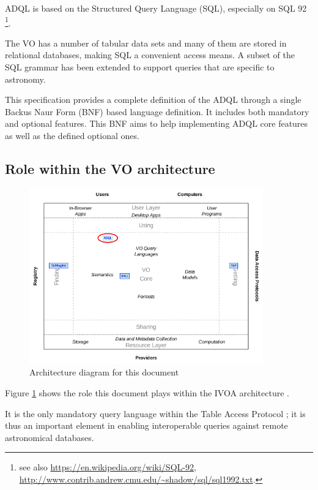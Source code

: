 \documentclass[11pt,a4paper]{ivoa}
\begin{document}
ADQL is based on the Structured Query Language (SQL), especially on SQL
92 \citep{std:SQL1992}\footnote{see also
\url{https://en.wikipedia.org/wiki/SQL-92},
\url{http://www.contrib.andrew.cmu.edu/~shadow/sql/sql1992.txt}.}.

The VO has a number of tabular data sets and many of them are stored in
relational databases, making SQL a convenient access means. A subset of the SQL
grammar has been extended to support queries that are specific to astronomy.

This specification provides a complete definition of the ADQL through a single
Backus Naur Form (BNF) based language definition. It includes both mandatory
and optional features.  This BNF aims to help implementing ADQL core
features as well as the defined optional ones.

\clearpage %
\subsection{Role within the VO architecture}
\label{sec:role}

\begin{figure}[th]
\centering
\includegraphics[width=0.9\textwidth]{role_diagram.pdf}
\caption{Architecture diagram for this document}
\label{fig:archdiag}
\end{figure}

Figure \ref{fig:archdiag} shows the role this document plays within the
IVOA architecture \VOArch{}.

It is the only mandatory query language within the Table Access Protocol
\TAPSpec{}; it is thus an important element in
enabling interoperable queries against remote astronomical databases.
\end{document}
